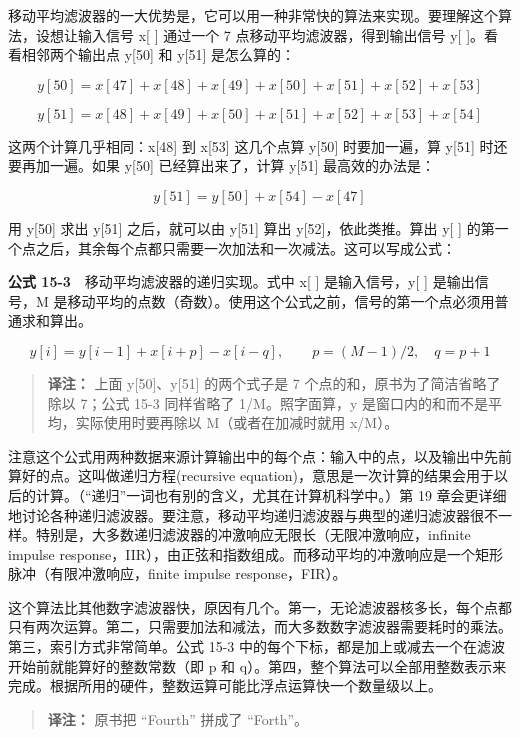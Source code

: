 移动平均滤波器的一大优势是，它可以用一种非常快的算法来实现。要理解这个算法，设想让输入信号
x{[} {]} 通过一个 7 点移动平均滤波器，得到输出信号 y{[}
{]}。看看相邻两个输出点 y{[}50{]} 和 y{[}51{]} 是怎么算的：

\[y[50] = x[47] + x[48] + x[49] + x[50] + x[51] + x[52] + x[53]\]

\[y[51] = x[48] + x[49] + x[50] + x[51] + x[52] + x[53] + x[54]\]

这两个计算几乎相同：x{[}48{]} 到 x{[}53{]} 这几个点算 y{[}50{]}
时要加一遍，算 y{[}51{]} 时还要再加一遍。如果 y{[}50{]}
已经算出来了，计算 y{[}51{]} 最高效的办法是：

\[y[51] = y[50] + x[54] - x[47]\]

用 y{[}50{]} 求出 y{[}51{]} 之后，就可以由 y{[}51{]} 算出
y{[}52{]}，依此类推。算出 y{[} {]}
的第一个点之后，其余每个点都只需要一次加法和一次减法。这可以写成公式：

\textbf{公式 15-3}　移动平均滤波器的递归实现。式中 x{[} {]}
是输入信号，y{[} {]} 是输出信号，M
是移动平均的点数（奇数）。使用这个公式之前，信号的第一个点必须用普通求和算出。

\[y[i] = y[i-1] + x[i+p] - x[i-q], \qquad p = (M-1)/2, \quad q = p + 1\]

\begin{quote}
\textbf{译注：} 上面 y{[}50{]}、y{[}51{]} 的两个式子是 7
个点的和，原书为了简洁省略了除以 7；公式 15-3 同样省略了
1/M。照字面算，y 是窗口内的和而不是平均，实际使用时要再除以
M（或者在加减时就用 x/M）。
\end{quote}

注意这个公式用两种数据来源计算输出中的每个点：输入中的点，以及输出中先前算好的点。这叫做递归方程(recursive
equation)，意思是一次计算的结果会用于以后的计算。（``递归''一词也有别的含义，尤其在计算机科学中。）第
19
章会更详细地讨论各种递归滤波器。要注意，移动平均递归滤波器与典型的递归滤波器很不一样。特别是，大多数递归滤波器的冲激响应无限长（无限冲激响应，infinite
impulse
response，IIR），由正弦和指数组成。而移动平均的冲激响应是一个矩形脉冲（有限冲激响应，finite
impulse response，FIR）。

这个算法比其他数字滤波器快，原因有几个。第一，无论滤波器核多长，每个点都只有两次运算。第二，只需要加法和减法，而大多数数字滤波器需要耗时的乘法。第三，索引方式非常简单。公式
15-3 中的每个下标，都是加上或减去一个在滤波开始前就能算好的整数常数（即
p 和
q）。第四，整个算法可以全部用整数表示来完成。根据所用的硬件，整数运算可能比浮点运算快一个数量级以上。

\begin{quote}
\textbf{译注：} 原书把 ``Fourth'' 拼成了 ``Forth''。
\end{quote}

